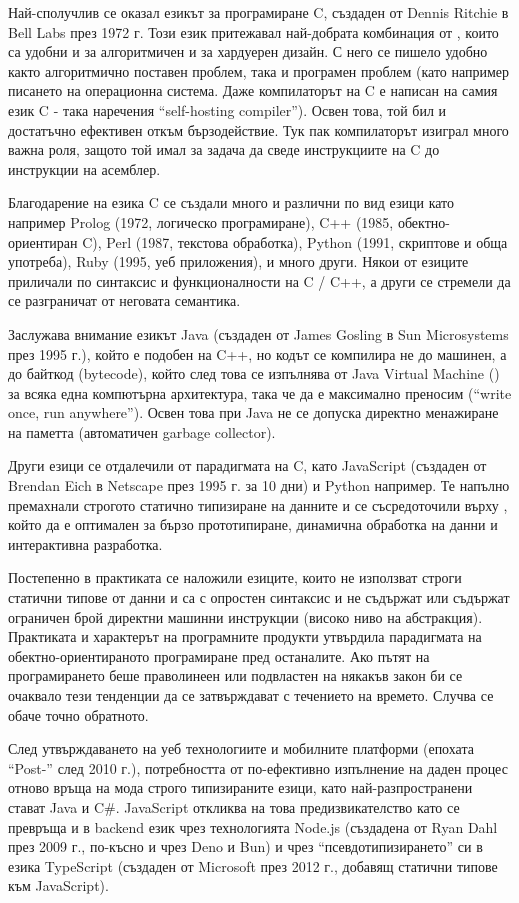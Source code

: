 Най-сполучлив се
оказал езикът за програмиране C, създаден от Dennis Ritchie в Bell Labs през 1972 г. Този език притежавал най-добрата
комбинация от , които са удобни и за алгоритмичен и за хардуерен дизайн. С него се пишело удобно както алгоритмично
поставен проблем, така и програмен проблем (като например писането на операционна система. Даже компилаторът на C е написан на самия език C - така наречения ``self-hosting compiler'').
Освен това, той бил и достатъчно ефективен откъм бързодействие. Тук пак компилаторът изиграл много важна роля,
защото той имал за задача да сведе инструкциите на C до инструкции на асемблер.

Благодарение на езика C се създали
много и различни по вид езици като например Prolog (1972, логическо програмиране), C++ (1985, обектно-ориентиран C), Perl (1987, текстова обработка), Python (1991, скриптове и обща употреба), Ruby (1995, уеб приложения), и много други. Някои от езиците приличали по синтаксис
и функционалности на C / C++, а други се стремели да се разграничат от неговата семантика.

Заслужава внимание езикът Java (създаден от James Gosling в Sun Microsystems през 1995 г.),
който е подобен на C++, но кодът се компилира не до машинен, а до байткод (bytecode), който след това се изпълнява от Java Virtual Machine () за всяка една компютърна архитектура, така че да е максимално преносим (``write once, run anywhere''). Освен това при Java не се допуска директно менажиране на паметта (автоматичен garbage collector).

Други езици се отдалечили от парадигмата на C, като JavaScript (създаден от Brendan Eich в Netscape през 1995 г. за 10 дни) и Python например. Те напълно премахнали
строгото статично типизиране на данните и се съсредоточили върху , който да е оптимален за бързо прототипиране, динамична обработка на данни и интерактивна разработка.

Постепенно в практиката се наложили езиците, които не използват строги статични типове от данни и са с опростен синтаксис и не съдържат
или съдържат ограничен брой директни машинни инструкции (високо ниво на абстракция). Практиката и характерът на програмните продукти утвърдила парадигмата
на обектно-ориентираното програмиране пред останалите. Ако пътят на програмирането беше праволинеен
или подвластен на някакъв закон би се очаквало тези тенденции да се затвърждават с течението на времето.
Случва се обаче точно обратното.

След утвърждаването на уеб технологиите и мобилните платформи (епохата ``Post-'' след 2010 г.), потребността от по-ефективно изпълнение на
даден процес отново връща на мода строго типизираните езици, като най-разпространени стават Java и C\#.
JavaScript откликва на това предизвикателство като се превръща и в backend език чрез технологията Node.js (създадена от Ryan Dahl през 2009 г.,
по-късно и чрез Deno и Bun) и чрез ``псевдотипизирането'' си в езика TypeScript (създаден от Microsoft през 2012 г., добавящ статични типове към JavaScript).

